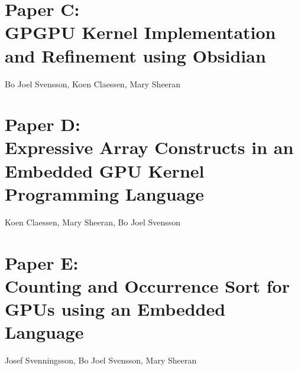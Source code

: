 \documentclass[a4paper]{book}
\newcommand{\paperC}{Paper C}
\newcommand{\paperCTitle}{GPGPU Kernel Implementation and Refinement using Obsidian}
\newcommand{\paperD}{Paper D}
\newcommand{\paperDTitle}{Expressive Array Constructs in an Embedded GPU Kernel Programming Language}
\newcommand{\paperE}{Paper E}
\newcommand{\paperETitle}{Counting and Occurrence Sort for GPUs using an Embedded Language}
\begin{document}
\section[\paperCTitle]{\paperC: \\ \paperCTitle}
\label{sec:paperC}


\begin{center} 
Bo Joel Svensson, Koen Claessen, Mary Sheeran
\end{center}




% 
\cleardoublepage 

\section[\paperDTitle]{\paperD: \\ \paperDTitle}
\label{sec:paperD}


\begin{center} 
Koen Claessen, Mary Sheeran, Bo Joel Svensson
\end{center}



% 
\cleardoublepage 

\section[\paperETitle]{\paperE: \\ \paperETitle}
\label{sec:paperE}


\begin{center} 
Josef Svenningsson, Bo Joel Svensson, Mary Sheeran 
\end{center}



\end{document}
